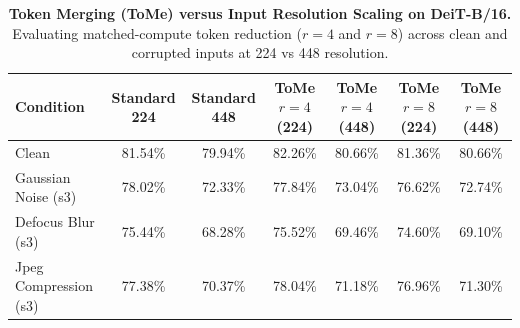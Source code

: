 \begin{table}[t]
\centering
\small
\caption{\textbf{Token Merging (ToMe) versus Input Resolution Scaling on DeiT-B/16.}
Evaluating matched-compute token reduction ($r=4$ and $r=8$) across clean and corrupted inputs at 224 vs 448 resolution.}
\label{tab:tome_comparison}
\begin{tabular}{lcccccc}
\toprule
\textbf{Condition} & \textbf{Standard 224} & \textbf{Standard 448} & \textbf{ToMe $r=4$ (224)} & \textbf{ToMe $r=4$ (448)} & \textbf{ToMe $r=8$ (224)} & \textbf{ToMe $r=8$ (448)} \\
\midrule
Clean & 81.54\% & 79.94\% & 82.26\% & 80.66\% & 81.36\% & 80.66\% \\
Gaussian Noise (s3) & 78.02\% & 72.33\% & 77.84\% & 73.04\% & 76.62\% & 72.74\% \\
Defocus Blur (s3) & 75.44\% & 68.28\% & 75.52\% & 69.46\% & 74.60\% & 69.10\% \\
Jpeg Compression (s3) & 77.38\% & 70.37\% & 78.04\% & 71.18\% & 76.96\% & 71.30\% \\
\bottomrule
\end{tabular}
\end{table}
